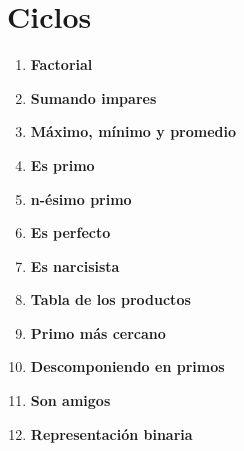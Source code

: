 \section{Ciclos}
\begin{enumerate}
    \item \textbf{Factorial}\\
    

    \item \textbf{Sumando impares}\\
    

    \item \textbf{Máximo, mínimo y promedio}\\
    

    \item \textbf{Es primo}\\
    

    \item \textbf{n-ésimo primo}\\
    
    
    \item \textbf{Es perfecto}\\
    

    \item \textbf{Es narcisista}\\
    

    \item \textbf{Tabla de los productos}\\
    

    \item \textbf{Primo más cercano}\\
    

    \item \textbf{Descomponiendo en primos}\\
    
    
    \item \textbf{Son amigos}\\
    

    \item \textbf{Representación binaria}
    
\end{enumerate}

